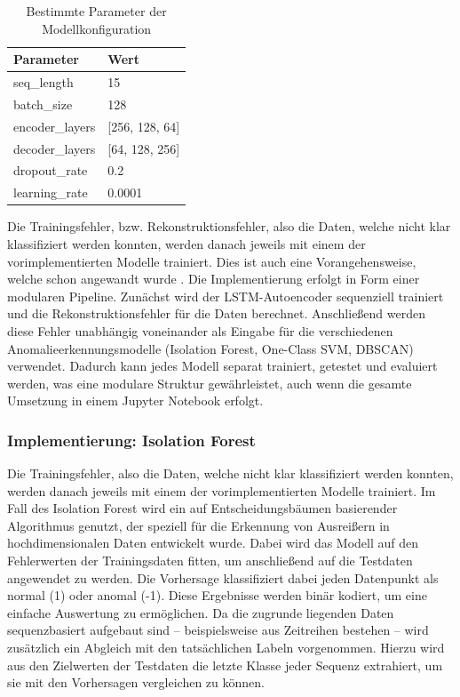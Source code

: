 \documentclass[a4paper,12pt]{article}
\begin{document}
	\begin{table}[h]
		\centering
		\begin{tabular}{ll}
			\toprule
			\textbf{Parameter}       & \textbf{Wert}            \\
			\midrule
			seq\_length             & 15                       \\
			batch\_size             & 128                      \\
			encoder\_layers         & [256, 128, 64]         \\
			decoder\_layers         & [64, 128, 256]         \\
			dropout\_rate           & 0.2                      \\
			learning\_rate          & 0.0001                   \\
			\bottomrule
		\end{tabular}
		\caption{Bestimmte Parameter der Modellkonfiguration}
		\label{tab:model_params}
	\end{table}
	
	Die Trainingsfehler, bzw. Rekonstruktionsfehler, also die Daten, welche nicht klar klassifiziert werden konnten, werden danach jeweils mit einem der vorimplementierten Modelle trainiert. Dies ist auch eine Vorangehensweise, welche schon angewandt wurde \cite{malhotra2016lstm}.
	Die Implementierung erfolgt in Form einer modularen Pipeline. Zunächst wird der LSTM-Autoencoder sequenziell trainiert und die Rekonstruktionsfehler für die Daten berechnet. Anschließend werden diese Fehler unabhängig voneinander als Eingabe für die verschiedenen Anomalieerkennungsmodelle (Isolation Forest, One-Class SVM, DBSCAN) verwendet. Dadurch kann jedes Modell separat trainiert, getestet und evaluiert werden, was eine modulare Struktur gewährleistet, auch wenn die gesamte Umsetzung in einem Jupyter Notebook erfolgt.
	
	\subsubsection{Implementierung: Isolation Forest}
	Die Trainingsfehler, also die Daten, welche nicht klar klassifiziert werden konnten, werden danach jeweils mit einem der vorimplementierten Modelle trainiert. Im Fall des Isolation Forest wird ein auf Entscheidungsbäumen basierender Algorithmus genutzt, der speziell für die Erkennung von Ausreißern in hochdimensionalen Daten entwickelt wurde. Dabei wird das Modell auf den Fehlerwerten der Trainingsdaten fitten, um anschließend auf die Testdaten angewendet zu werden. Die Vorhersage klassifiziert dabei jeden Datenpunkt als normal (1) oder anomal (-1). Diese Ergebnisse werden binär kodiert, um eine einfache Auswertung zu ermöglichen. Da die zugrunde liegenden Daten sequenzbasiert aufgebaut sind – beispielsweise aus Zeitreihen bestehen – wird zusätzlich ein Abgleich mit den tatsächlichen Labeln vorgenommen. Hierzu wird aus den Zielwerten der Testdaten die letzte Klasse jeder Sequenz extrahiert, um sie mit den Vorhersagen vergleichen zu können.
	
\end{document}
